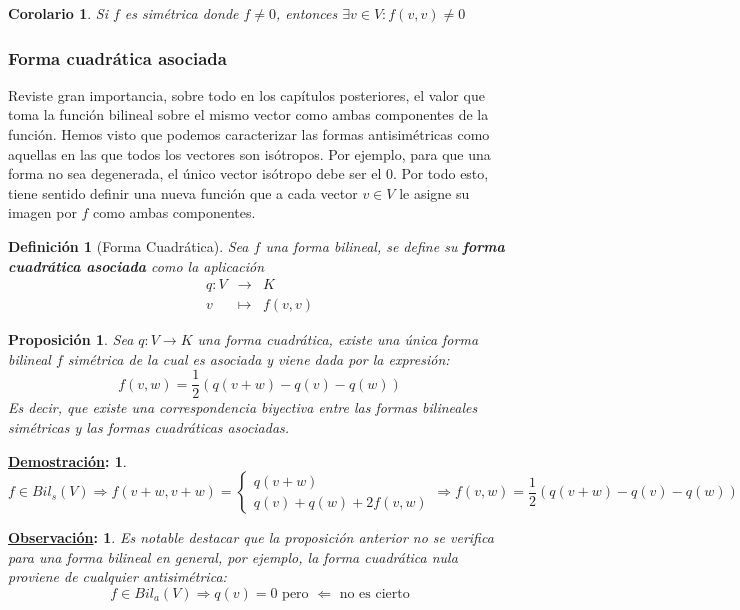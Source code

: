 \documentclass[10pt,a4paper,openright]{book}
\theoremstyle{break}
\newtheorem*{defi}{Definición}
\newtheorem*{coro}{Corolario}
\newtheorem*{prop}{Proposición}
\newtheorem*{demo}{\underline{Demostración}:}
\newtheorem*{obs}{\underline{Observación}:}
\begin{document}
\begin{coro}
Si $f$ es simétrica donde $f\neq 0$, entonces $\exists v\in V: f(v,v)\neq 0$
\end{coro}

\subsubsection{Forma cuadrática asociada}
Reviste gran importancia, sobre todo en los capítulos posteriores, el valor que toma la función bilineal sobre el mismo vector como ambas componentes de la función. Hemos visto que podemos caracterizar las formas antisimétricas como aquellas en las que todos los vectores son isótropos. Por ejemplo, para que una forma no sea degenerada, el único vector isótropo debe ser el 0. Por todo esto, tiene sentido definir una nueva función que a cada vector $v\in V$ le asigne su imagen por $f$ como ambas componentes.
 
\begin{defi}[Forma Cuadrática]
Sea $f$ una forma bilineal, se define su \textbf{forma cuadrática asociada} como la aplicación
\begin{eqnarray*}
q:V &\longrightarrow& K \\ v &\longmapsto& f(v,v) 
\end{eqnarray*}
\end{defi}

\begin{prop}
Sea $q: V\rightarrow K$ una forma cuadrática, existe una única forma bilineal $f$ simétrica de la cual es asociada y viene dada por la expresión:
$$ f(v,w) = \frac{1}{2}\left( q (v+w) -q(v)-q(w)\right)$$
Es decir, que existe una correspondencia biyectiva entre las formas bilineales simétricas y las formas cuadráticas asociadas.
\end{prop}
\begin{demo}
$$f\in Bil_s(V)\Rightarrow f(v+w,v+w)=\begin{cases} q(v+w) \\ q(v)+q(w)+2f(v,w)\end{cases}\Rightarrow f(v,w) = \frac{1}{2}\left( q (v+w) -q(v)-q(w)\right)$$
\end{demo}

\begin{obs}
Es notable destacar que la proposición anterior no se verifica para una forma bilineal en general, por ejemplo, la forma cuadrática nula proviene de cualquier antisimétrica:
$$f\in Bil_a(V) \Rightarrow q(v) = 0 \mbox{ pero }\Leftarrow \mbox{ no es cierto}$$
\end{obs}
\end{document}
